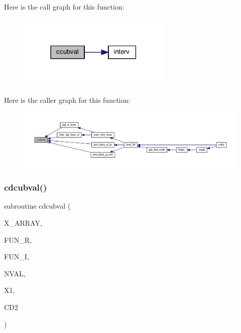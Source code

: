 Here is the call graph for this function\+:\nopagebreak
\begin{figure}[H]
\begin{center}
\leavevmode
\includegraphics[width=207pt]{Leroi_8f90_a5a4be24a4461d42dc9be5d5388c4d366_cgraph}
\end{center}
\end{figure}
Here is the caller graph for this function\+:\nopagebreak
\begin{figure}[H]
\begin{center}
\leavevmode
\includegraphics[width=350pt]{Leroi_8f90_a5a4be24a4461d42dc9be5d5388c4d366_icgraph}
\end{center}
\end{figure}
\mbox{\label{Leroi_8f90_ab28d8a79c971f683b68fae4db0553909}} 
\subsubsection{\texorpdfstring{cdcubval()}{cdcubval()}}
{\footnotesize\ttfamily subroutine cdcubval (\begin{DoxyParamCaption}\item[{real, dimension(nval)}]{X\+\_\+\+A\+R\+R\+AY,  }\item[{real, dimension(4,nval)}]{F\+U\+N\+\_\+R,  }\item[{real, dimension(4,nval)}]{F\+U\+N\+\_\+I,  }\item[{integer}]{N\+V\+AL,  }\item[{real(kind=ql)}]{X1,  }\item[{complex(kind=ql)}]{C\+D2 }\end{DoxyParamCaption})}

